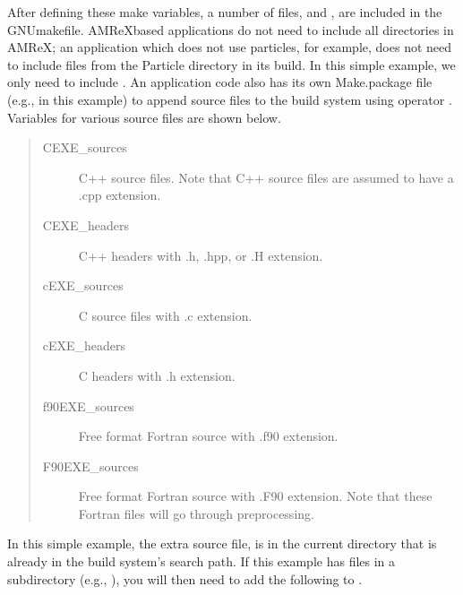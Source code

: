 \documentclass[letterpaper,10pt,english]{sphinxmanual}
\begin{document}
\sphinxAtStartPar
After defining these make variables, a number of files,  and , are included in the GNUmakefile. AMReX\sphinxhyphen{}based
applications do not need to include all directories in AMReX; an application
which does not use particles, for example, does not need to include files from
the Particle directory in its build.  In this simple example, we only need to
include . An application code also has
its own Make.package file (e.g.,  in this example) to append
source files to the build system using operator \sphinxcode{\sphinxupquote{+=}}. Variables for various
source files are shown below.
\begin{quote}
\begin{description}
\item[{CEXE\_sources}] \leavevmode
\sphinxAtStartPar
C++ source files. Note that C++ source files are assumed to have a .cpp
extension.

\item[{CEXE\_headers}] \leavevmode
\sphinxAtStartPar
C++ headers with .h, .hpp, or .H extension.

\item[{cEXE\_sources}] \leavevmode
\sphinxAtStartPar
C source files with .c extension.

\item[{cEXE\_headers}] \leavevmode
\sphinxAtStartPar
C headers with .h extension.

\item[{f90EXE\_sources}] \leavevmode
\sphinxAtStartPar
Free format Fortran source with .f90 extension.

\item[{F90EXE\_sources}] \leavevmode
\sphinxAtStartPar
Free format Fortran source with .F90 extension.  Note that these
Fortran files will go through preprocessing.

\end{description}
\end{quote}

\sphinxAtStartPar
In this simple example, the extra source file,  is in the current
directory that is already in the build system’s search path. If this example
has files in a subdirectory (e.g., ), you will then need to add the
following to .
\end{document}
